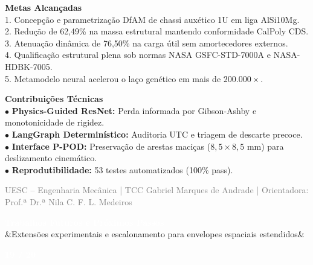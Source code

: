\documentclass[11pt]{article}
\newcommand{\slideheader}[3]{
    \noindent
    \begin{minipage}{\textwidth}
        \colorbox{SpaceNavy}{
            \parbox{\dimexpr\textwidth-2\fboxsep\relax}{
                \vspace{0.2cm}
                \hspace{0.3cm}
                \begin{minipage}{0.85\textwidth}
                    {\Large \textbf{\textcolor{white}{#1}}}\\[0.1cm]
                    \ifx&#2&\else{\small \textbf{\textcolor{SpaceGold}{#2}}}\fi
                \end{minipage}
                \hfill
                \begin{minipage}{0.10\textwidth}
                    \raggedleft
                    {\large \textbf{\textcolor{white}{#3 / 20}}}\hspace{0.3cm}
                \end{minipage}
                \vspace{0.2cm}
            }
        }
    \end{minipage}
    \vspace{0.4cm}
}
\newcommand{\slidefooter}{
    \vfill
    \noindent
    \begin{minipage}{\textwidth}
        \centering
        \scriptsize \textcolor{gray}{UESC -- Engenharia Mecânica | TCC Gabriel Marques de Andrade | Orientadora: Prof.ª Dr.ª Nila C. F. L. Medeiros}
    \end{minipage}
}
\begin{document}
\begin{minipage}[t]{0.48\textwidth}
    \textbf{\textcolor{NavyAccent}{Metas Alcançadas}}\\[0.2cm]
    \small
    1. Concepção e parametrização DfAM de chassi auxético 1U em liga AlSi10Mg.\\
    2. Redução de 62,49\% na massa estrutural mantendo conformidade CalPoly CDS.\\
    3. Atenuação dinâmica de 76,50\% na carga útil sem amortecedores externos.\\
    4. Qualificação estrutural plena sob normas NASA GSFC-STD-7000A e NASA-HDBK-7005.\\
    5. Metamodelo neural acelerou o laço genético em mais de $200.000\times$.
\end{minipage}
\hfill
\begin{minipage}[t]{0.48\textwidth}
    \textbf{\textcolor{NavyAccent}{Contribuições Técnicas}}\\[0.2cm]
    \small
    $\bullet$ \textbf{Physics-Guided ResNet:} Perda informada por Gibson-Ashby e monotonicidade de rigidez.\\
    $\bullet$ \textbf{LangGraph Determinístico:} Auditoria UTC e triagem de descarte precoce.\\
    $\bullet$ \textbf{Interface P-POD:} Preservação de arestas maciças ($8{,}5 \times 8{,}5\text{ mm}$) para deslizamento cinemático.\\
    $\bullet$ \textbf{Reprodutibilidade:} 53 testes automatizados (100\% pass).
\end{minipage}

\slidefooter
\clearpage

\slideheader{Trabalhos Futuros e Próximos Passos}{Extensões experimentais e escalonamento para envelopes espaciais estendidos}{19}
\end{document}

